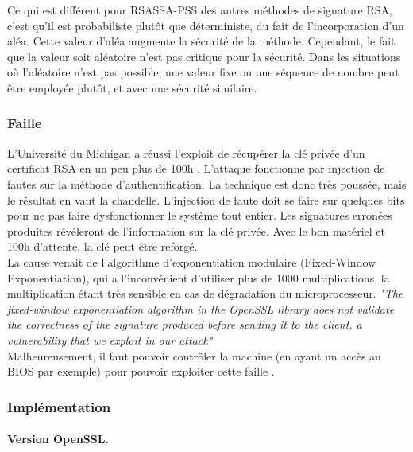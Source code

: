 Ce qui est différent pour RSASSA-PSS des autres méthodes de signature RSA, c'est qu'il est probabiliste plutôt que déterministe, du fait de  l'incorporation d'un aléa. Cette valeur d'aléa augmente la sécurité de la méthode. Cependant, le fait que la valeur soit aléatoire n'est pas critique pour la sécurité. Dans les situations où l'aléatoire n'est pas possible, une valeur fixe ou une séquence de nombre peut être employée plutôt, et avec une sécurité similaire.

		\subsubsection{Faille}
		
			L'Université du Michigan a réussi l'exploit de récupérer la 
			clé privée d'un certificat RSA en un peu plus de 100h
			\cite{andrea2010RSA} \cite{opensslvuln2010}. 	L'attaque fonctionne par injection de fautes \cite{fault2008lawson} 
			sur la méthode d'authentification. 
			La technique est donc très poussée, mais le résultat en vaut 
			la chandelle. L'injection de faute doit se faire sur quelques bits pour ne pas faire 	dysfonctionner le système tout entier. 
			Les signatures erronées produites révéleront de l'information 
			sur la clé privée. 
			Avec le bon matériel et 100h d'attente, la clé peut être reforgé.\\
			
		
			La cause venait de l'algorithme d'exponentiation modulaire 
			(Fixed-Window Exponentiation), qui a l'inconvénient d'utiliser 
			plus de 1000 multiplications, la multiplication étant très sensible en cas de dégradation du	microprocesseur.	\textit{"The fixed-window exponentiation algorithm in the OpenSSL library 
			does not validate the correctness of the signature produced before
			sending it to the client, a vulnerability that we exploit in our
			attack"}\\
			
			Malheureusement, il faut pouvoir 	contrôler la machine (en ayant un accès au BIOS par exemple) pour pouvoir exploiter cette faille .
	
		
		\subsubsection{Implémentation}
			
			\paragraph{Version OpenSSL.\\}
			
